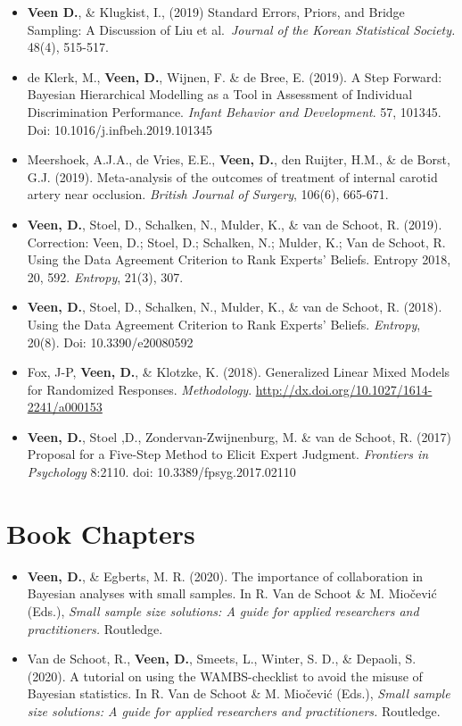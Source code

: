 \documentclass[openright,titlepage,12pt,a4paper]{book}
\begin{document}
\begin{itemize}
\item
  \textbf{Veen D.}, \& Klugkist, I., (2019) Standard Errors, Priors, and Bridge Sampling: A Discussion of Liu et al.~\emph{Journal of the Korean Statistical Society.} 48(4), 515-517.
\item
  de Klerk, M., \textbf{Veen, D.}, Wijnen, F. \& de Bree, E. (2019). A Step Forward: Bayesian Hierarchical Modelling as a Tool in Assessment of Individual Discrimination Performance. \emph{Infant Behavior and Development}. 57, 101345. Doi: 10.1016/j.infbeh.2019.101345
\item
  Meershoek, A.J.A., de Vries, E.E., \textbf{Veen, D.}, den Ruijter, H.M., \& de Borst, G.J. (2019).
  Meta‐analysis of the outcomes of treatment of internal carotid artery near occlusion. \emph{British Journal of Surgery}, 106(6), 665-671.
\item
  \textbf{Veen, D.}, Stoel, D., Schalken, N., Mulder, K., \& van de Schoot, R. (2019). Correction: Veen, D.; Stoel, D.; Schalken, N.; Mulder, K.; Van de Schoot, R. Using the Data Agreement Criterion to Rank Experts' Beliefs. Entropy 2018, 20, 592. \emph{Entropy}, 21(3), 307.
\item
  \textbf{Veen, D.}, Stoel, D., Schalken, N., Mulder, K., \& van de Schoot, R. (2018). Using the Data Agreement Criterion to Rank Experts' Beliefs. \emph{Entropy}, 20(8). Doi: 10.3390/e20080592
\item
  Fox, J-P, \textbf{Veen, D.}, \& Klotzke, K. (2018). Generalized Linear Mixed Models for Randomized Responses. \emph{Methodology}. \url{http://dx.doi.org/10.1027/1614-2241/a000153}
\item
  \textbf{Veen, D.}, Stoel ,D., Zondervan-Zwijnenburg, M. \& van de Schoot, R. (2017) Proposal for a Five-Step Method to Elicit Expert Judgment. \emph{Frontiers in Psychology} 8:2110. doi: 10.3389/fpsyg.2017.02110
\end{itemize}

\hypertarget{book-chapters}{%
\section*{Book Chapters}\label{book-chapters}}

\begin{itemize}
\item
  \textbf{Veen, D.}, \& Egberts, M. R. (2020). The importance of collaboration in Bayesian analyses with small samples. In R. Van de Schoot \& M. Miočević (Eds.), \emph{Small sample size solutions: A guide for applied researchers and practitioners.} Routledge.
\item
  Van de Schoot, R., \textbf{Veen, D.}, Smeets, L., Winter, S. D., \& Depaoli, S. (2020). A tutorial on using the WAMBS-checklist to avoid the misuse of Bayesian statistics. In R. Van de Schoot \& M. Miočević (Eds.), \emph{Small sample size solutions: A guide for applied researchers and practitioners.} Routledge.
\end{itemize}
\end{document}
